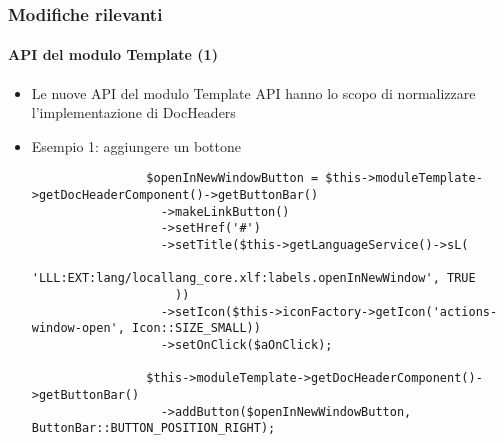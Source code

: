 \begin{frame}[fragile]
	\frametitle{Modifiche rilevanti}
	\framesubtitle{API del modulo Template (1)}

	\lstset{basicstyle=\tiny\ttfamily}

	\begin{itemize}

		\item Le nuove API del modulo Template API hanno lo scopo di normalizzare l'implementazione di DocHeaders

		\item Esempio 1: aggiungere un bottone

			\begin{lstlisting}
				$openInNewWindowButton = $this->moduleTemplate->getDocHeaderComponent()->getButtonBar()
				  ->makeLinkButton()
				  ->setHref('#')
				  ->setTitle($this->getLanguageService()->sL(
				    'LLL:EXT:lang/locallang_core.xlf:labels.openInNewWindow', TRUE
				    ))
				  ->setIcon($this->iconFactory->getIcon('actions-window-open', Icon::SIZE_SMALL))
				  ->setOnClick($aOnClick);

				$this->moduleTemplate->getDocHeaderComponent()->getButtonBar()
				  ->addButton($openInNewWindowButton, ButtonBar::BUTTON_POSITION_RIGHT);
			\end{lstlisting}
	\end{itemize}

\end{frame}


